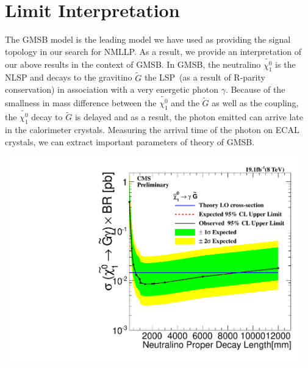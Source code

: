 \chapter{Limit Interpretation}
\label{Limit_Results_and_Intepretation_Chapter}
The GMSB model is the leading model we have used as providing the signal topology in our search for NMLLP. As a result, we provide an interpretation of our above results in the context of GMSB.
In GMSB, the neutralino $\tilde{\chi^{0}_{1}}$ is the NLSP and decays to the gravitino $\tilde{G}$ the LSP~(as a result of R-parity conservation) in association with a very energetic photon $\gamma$. Because of the smallness in mass difference between the  $\tilde{\chi^{0}_{1}}$ and the $\tilde{G}$ as well as the coupling, the $\tilde{\chi^{0}_{1}}$ decay to $\tilde{G}$ is delayed and as a result, the photon emitted can arrive late in the calorimeter crystals.  Measuring the arrival time of the photon on ECAL crystals, we can extract important parameters of  theory of GMSB.

\begin{center}
\centering
\mbox{
\includegraphics[width=5in]{THESISPLOTS/Neutralino_CrossSecTimesBR_Uplimit.pdf}}
\label{fig:SPS8_Ulimit}
\end{center}


